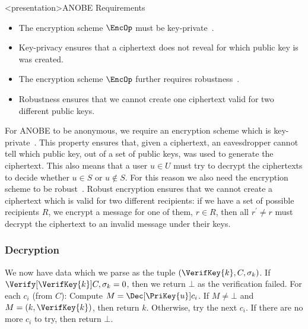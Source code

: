 \begin{frame}<presentation>{ANOBE Requirements}
  \begin{itemize}
    \item The encryption scheme \(\EncOp\) must be 
      key-private~\cite{KeyPrivacy}.

    \item Key-privacy ensures that a ciphertext does not reveal for which 
      public key is was created.

      \pause{}

    \item The encryption scheme \(\EncOp\) further requires 
      robustness~\cite{RobustEncryption}.

    \item Robustness ensures that we cannot create one ciphertext valid for two 
      different public keys.
  \end{itemize}
\end{frame}

For \ac{ANOBE} to be anonymous, we require an encryption scheme which is 
key-private~\cite{KeyPrivacy}.
This property ensures that, given a ciphertext, an eavesdropper cannot tell 
which public key, out of a set of public keys, was used to generate the 
ciphertext.
This also means that a user \(u\in U\) must try to decrypt the ciphertexts to 
decide whether \(u\in S\) or \(u\notin S\).
For this reason we also need the encryption scheme to be 
robust~\cite{RobustEncryption}.
Robust encryption ensures that we cannot create a ciphertext which is valid for 
two different recipients:
if we have a set of possible recipients \(R\), we encrypt a message for one of 
them, \(r\in R\), then all \(r^\prime\neq r\) must decrypt the ciphertext to an 
invalid message under their keys.

\subsubsection<article>{Decryption}

We now have data which we parse as the tuple \((\VerifKey{k}, C, \sigma_k)\).
If \(\Verify[\VerifKey{k}]{ C, \sigma_k } = 0\), then we return \(\bot\) as the 
verification failed.
For each \(c_i\) (from \(C\)):
Compute \(M = \Dec[\PriKey{u}]{ c_i }\).
If \(M \neq \bot\) and \(M = (k, \VerifKey{k})\), then return \(k\).
Otherwise, try the next \(c_i\).
If there are no more \(c_i\) to try, then return \(\bot\).

